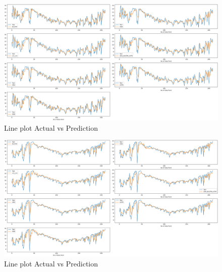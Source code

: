 \documentclass[a4paper,fleqn]{cas-sc}
\begin{document}
      \begin{figure}[!ht]
      \centering
      \includegraphics[width=\textwidth]{South Delhi_act vs pred (1)}
      \caption{Line plot Actual vs Prediction}
      \label{Line plot10}
      \end{figure}
      
      \begin{figure}[!ht]
      \centering
      \includegraphics[width=\textwidth]{udaipur_act vs pred}
      \caption{Line plot Actual vs Prediction}
      \label{Line plot11}
      \end{figure}
      
\end{document}
